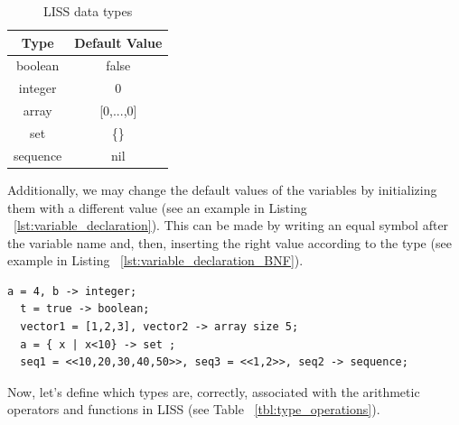 \documentclass[
  oneside,
  11pt, a4paper,
  footinclude=true,
  headinclude=true,
  cleardoublepage=empty
]{scrbook}
\begin{document}
\begin{table}[]
\centering
\caption{LISS data types}
\label{tbl:data_types}
\begin{tabular}{|c|c|}
\hline
\textbf{Type}       & \multicolumn{1}{l|}{\textbf{Default Value}} \\ \hline
boolean             & false                                       \\ \hline
integer             & 0                                           \\ \hline
array               & {[}0,...,0{]}                               \\ \hline
set                 & \{\}                                        \\ \hline
sequence            & nil                                         \\ \hline
\end{tabular}
\end{table}

\newpage
Additionally, we may change the default values of the variables by initializing them with a different value (see an example in Listing ~\ref{lst:variable_declaration}).
This can be made by writing an equal symbol after the variable name and, then, inserting the right value according to the type (see example in Listing ~\ref{lst:variable_declaration_BNF}).

\begin{lstlisting}[caption={Initialize a variable},label={lst:variable_declaration}]
  a = 4, b -> integer;
  t = true -> boolean;
  vector1 = [1,2,3], vector2 -> array size 5;
  a = { x | x<10} -> set ;
  seq1 = <<10,20,30,40,50>>, seq3 = <<1,2>>, seq2 -> sequence;
\end{lstlisting}

Now, let's define which types are, correctly, associated with the arithmetic operators and functions in LISS (see Table ~\ref{tbl:type_operations}).
\end{document}
